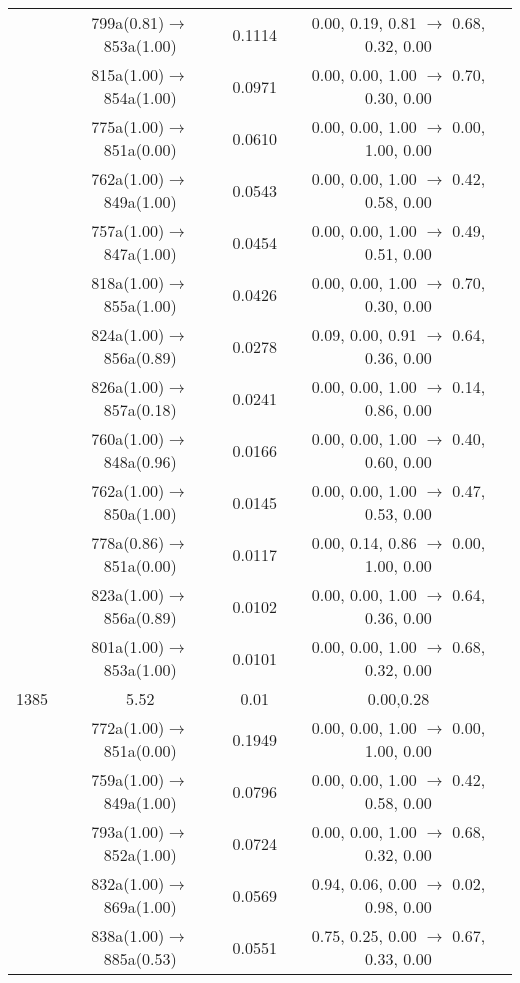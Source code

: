 \documentclass[10pt,a4paper]{article}
\begin{document}
\begin{longtable}{c|c|c|c}
 	& 799a(0.81)$\rightarrow$853a(1.00) &	 0.1114 &	 0.00, 0.19, 0.81 $\rightarrow$ 0.68, 0.32, 0.00 \\ 
 	& 815a(1.00)$\rightarrow$854a(1.00) &	 0.0971 &	 0.00, 0.00, 1.00 $\rightarrow$ 0.70, 0.30, 0.00 \\ 
 	& 775a(1.00)$\rightarrow$851a(0.00) &	 0.0610 &	 0.00, 0.00, 1.00 $\rightarrow$ 0.00, 1.00, 0.00 \\ 
 	& 762a(1.00)$\rightarrow$849a(1.00) &	 0.0543 &	 0.00, 0.00, 1.00 $\rightarrow$ 0.42, 0.58, 0.00 \\ 
 	& 757a(1.00)$\rightarrow$847a(1.00) &	 0.0454 &	 0.00, 0.00, 1.00 $\rightarrow$ 0.49, 0.51, 0.00 \\ 
 	& 818a(1.00)$\rightarrow$855a(1.00) &	 0.0426 &	 0.00, 0.00, 1.00 $\rightarrow$ 0.70, 0.30, 0.00 \\ 
 	& 824a(1.00)$\rightarrow$856a(0.89) &	 0.0278 &	 0.09, 0.00, 0.91 $\rightarrow$ 0.64, 0.36, 0.00 \\ 
 	& 826a(1.00)$\rightarrow$857a(0.18) &	 0.0241 &	 0.00, 0.00, 1.00 $\rightarrow$ 0.14, 0.86, 0.00 \\ 
 	& 760a(1.00)$\rightarrow$848a(0.96) &	 0.0166 &	 0.00, 0.00, 1.00 $\rightarrow$ 0.40, 0.60, 0.00 \\ 
 	& 762a(1.00)$\rightarrow$850a(1.00) &	 0.0145 &	 0.00, 0.00, 1.00 $\rightarrow$ 0.47, 0.53, 0.00 \\ 
 	& 778a(0.86)$\rightarrow$851a(0.00) &	 0.0117 &	 0.00, 0.14, 0.86 $\rightarrow$ 0.00, 1.00, 0.00 \\ 
 	& 823a(1.00)$\rightarrow$856a(0.89) &	 0.0102 &	 0.00, 0.00, 1.00 $\rightarrow$ 0.64, 0.36, 0.00 \\ 
 	& 801a(1.00)$\rightarrow$853a(1.00) &	 0.0101 &	 0.00, 0.00, 1.00 $\rightarrow$ 0.68, 0.32, 0.00 \\ 
 \hline1385 &	 5.52 &	 0.01 &	 0.00,0.28 \\ 
  	& 772a(1.00)$\rightarrow$851a(0.00) &	 0.1949 &	 0.00, 0.00, 1.00 $\rightarrow$ 0.00, 1.00, 0.00 \\ 
 	& 759a(1.00)$\rightarrow$849a(1.00) &	 0.0796 &	 0.00, 0.00, 1.00 $\rightarrow$ 0.42, 0.58, 0.00 \\ 
 	& 793a(1.00)$\rightarrow$852a(1.00) &	 0.0724 &	 0.00, 0.00, 1.00 $\rightarrow$ 0.68, 0.32, 0.00 \\ 
 	& 832a(1.00)$\rightarrow$869a(1.00) &	 0.0569 &	 0.94, 0.06, 0.00 $\rightarrow$ 0.02, 0.98, 0.00 \\ 
 	& 838a(1.00)$\rightarrow$885a(0.53) &	 0.0551 &	 0.75, 0.25, 0.00 $\rightarrow$ 0.67, 0.33, 0.00 \\ 

\end{longtable}
\end{document}
